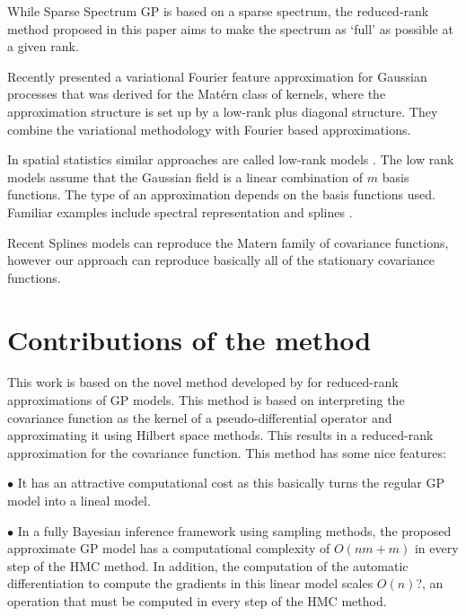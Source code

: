 \documentclass[]{interact}
\theoremstyle{plain}%
\theoremstyle{definition}
\theoremstyle{remark}
\begin{document}
While Sparse Spectrum GP is based on a sparse spectrum, the reduced-rank method proposed in this paper aims to make the spectrum as ‘full’ as possible at a given rank.

Recently \citep{hensman2017variational} presented a variational Fourier feature approximation for Gaussian processes that was derived for the Mat{\'e}rn class of kernels, where the approximation structure is set up by a low-rank plus diagonal structure. They combine the variational methodology with Fourier based approximations.

In spatial statistics similar approaches are called low-rank models \citep{diggle2007springer}. The low rank models assume that the Gaussian field is a linear combination of $m$ basis functions. The type of an approximation depends on the basis functions used. Familiar examples include spectral representation \citep{diggle2007springer,paciorek2007computational,paciorek2007bayesian} and splines \citep{wood2003thin}. 

Recent Splines models can reproduce the Matern family of covariance functions, however our approach can reproduce basically all of the stationary covariance functions.


\section{Contributions of the method}

This work is based on the novel method developed by \cite{solin2018hilbert} for reduced-rank approximations of GP models. This method is based on interpreting the covariance function as the kernel of a pseudo-differential operator and approximating it using Hilbert space methods. This results in a reduced-rank approximation for the covariance function. This method has some nice features:

\vspace{2mm}
$\bullet$ It has an attractive computational cost as this basically turns the regular GP model into a lineal model.

\vspace{2mm}
$\bullet$ In a fully Bayesian inference framework using sampling methods, the proposed approximate GP model has a computational complexity of $O(nm+m)$ in every step of the HMC method. In addition, the computation of the automatic differentiation to compute the gradients in this linear model scales $O(n)$?, an operation that must be computed in every step of the HMC method.
\end{document}
